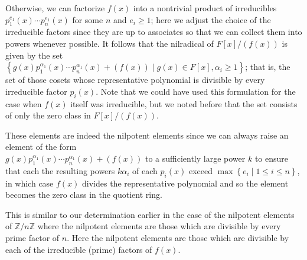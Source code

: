 \documentclass[11pt]{article}
\newcommand{\cbr}[1]{\left\{#1\right\}}
\begin{document}
\begin{enumerate}
    Otherwise, we can factorize $f(x)$ into a nontrivial product of irreducibles $p_1^{e_1}(x)\cdots p_n^{e_1}(x)$ for some $n$ and $e_i\geq 1$; here we adjust the choice of the irreducible factors since they are up to associates so that we can collect them into powers whenever possible. It follows that the nilradical of $F[x]/(f(x))$ is given by the set $\cbr{g(x)p_1^{\alpha_1}(x)\cdots p_n^{\alpha_1}(x)  + (f(x))\mid g(x)\in F[x],\alpha_i\geq 1}$; that is, the set of those cosets whose representative polynomial is divisible by every irreducible factor $p_i(x)$. Note that we could have used this formulation for the case when $f(x)$ itself was irreducible, but we noted before that the set consists of only the zero class in $F[x]/(f(x))$.
    
    These elements are indeed the nilpotent elements since we can always raise an element of the form\\ $g(x)p_1^{\alpha_1}(x)\cdots p_n^{\alpha_1}(x)  + (f(x))$ to a sufficiently large power $k$ to ensure that each the resulting powers $k\alpha_i$ of each $p_i(x)$ exceed $\max\cbr{e_i\mid 1\leq i \leq n}$, in which case $f(x)$ divides the representative polynomial and so the element becomes the zero class in the quotient ring. 
    
    This is similar to our determination earlier in the case of the nilpotent elements of $\mathbb{Z}/n\mathbb{Z}$ where the nilpotent elements are those which are divisible by every prime factor of $n$. Here the nilpotent elements are those which are divisible by each of the irreducible (prime) factors of $f(x)$.


\end{enumerate}
\end{document}

